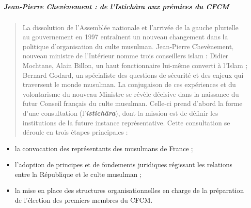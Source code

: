\hypertarget{jean-pierre-chevuxe8nement-de-listichuxe2ra-aux-pruxe9mices-du-cfcm}{%
\subparagraph{\texorpdfstring{Jean-Pierre Chevènement : de
l'\emph{Istichâra} aux prémices du
CFCM}{Jean-Pierre Chevènement : de l'Istichâra aux prémices du CFCM}}\label{jean-pierre-chevuxe8nement-de-listichuxe2ra-aux-pruxe9mices-du-cfcm}}

\begin{quote}
La dissolution de l'Assemblée nationale et l'arrivée de la gauche
plurielle au gouvernement en 1997 entraînent un nouveau changement dans
la politique d'organisation du culte musulman. Jean-Pierre Chevènement,
nouveau ministre de l'Intérieur nomme trois conseillers islam : Didier
Mochtane, Alain Billon, un haut fonctionnaire lui-même converti à
l'Islam ; Bernard Godard, un spécialiste des questions de sécurité et
des enjeux qui traversent le monde musulman. La conjugaison de ces
expériences et du volontarisme du nouveau Ministre se révèle décisive
dans la naissance du futur Conseil français du culte musulman. Celle-ci
prend d'abord la forme d'une consultation (l'\emph{\textbf{istichâra}}),
dont la mission est de définir les institutions de la future instance
représentative. Cette consultation se déroule en trois étapes
principales :
\end{quote}

\begin{itemize}
\item
  la convocation des représentants des musulmans de France ;
\item
  l'adoption de principes et de fondements juridiques régissant les
  relations entre la République et le culte musulman ;
\item
  la mise en place des structures organisationnelles en charge de la
  préparation de l'élection des premiers membres du CFCM.
\end{itemize}

